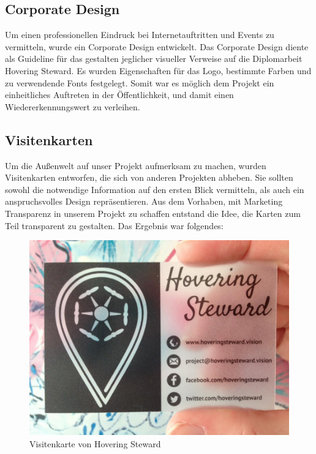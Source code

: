     \subsection*{Corporate Design}
    Um einen professionellen Eindruck bei Internetauftritten und Events zu vermitteln, wurde ein Corporate Design entwickelt.
    Das Corporate Design diente als Guideline für das gestalten jeglicher visueller Verweise auf die Diplomarbeit Hovering Steward.
    Es wurden Eigenschaften für das Logo, bestimmte Farben und zu verwendende Fonts festgelegt.
    Somit war es möglich dem Projekt ein einheitliches Auftreten in der Öffentlichkeit, und damit einen Wiedererkennungswert zu verleihen.

    \subsection*{Visitenkarten}
    Um die Außenwelt auf unser Projekt aufmerksam zu machen, wurden Visitenkarten entworfen, die sich von anderen Projekten abheben.
    Sie sollten sowohl die notwendige Information auf den ersten Blick vermitteln, als auch ein anspruchsvolles Design repräsentieren. Aus dem Vorhaben,
    mit Marketing Transparenz in unserem Projekt zu schaffen entstand die Idee, die Karten zum Teil transparent zu gestalten.
    Das Ergebnis war folgendes:

    \begin{figure}[H]
      \begin{centering}
      \includegraphics[width = 1\textwidth]{Bilder/visitenkarte.jpg}
      \par\end{centering}
      \caption{Visitenkarte von Hovering Steward}
      \label{visitenkarte}
    \end{figure}

